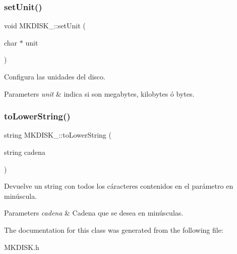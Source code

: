 \subsubsection{\texorpdfstring{set\+Unit()}{setUnit()}}
{\footnotesize\ttfamily void M\+K\+D\+I\+S\+K\+\_\+\+::set\+Unit (\begin{DoxyParamCaption}\item[{char $\ast$}]{unit }\end{DoxyParamCaption})}

Configura las unidades del disco. 
\begin{DoxyParams}{Parameters}
{\em unit} & indica si son megabytes, kilobytes ó bytes. \\
\hline
\end{DoxyParams}
\mbox{\label{classMKDISK___a79ea3d7a98d06a929418dad2cd380523}} 
\subsubsection{\texorpdfstring{to\+Lower\+String()}{toLowerString()}}
{\footnotesize\ttfamily string M\+K\+D\+I\+S\+K\+\_\+\+::to\+Lower\+String (\begin{DoxyParamCaption}\item[{string}]{cadena }\end{DoxyParamCaption})}

Devuelve un string con todos los cáracteres contenidos en el parámetro en minúscula. 
\begin{DoxyParams}{Parameters}
{\em cadena} & Cadena que se desea en minúsculas. \\
\hline
\end{DoxyParams}


The documentation for this class was generated from the following file\+:\begin{DoxyCompactItemize}
\item 
M\+K\+D\+I\+S\+K.\+h\end{DoxyCompactItemize}
